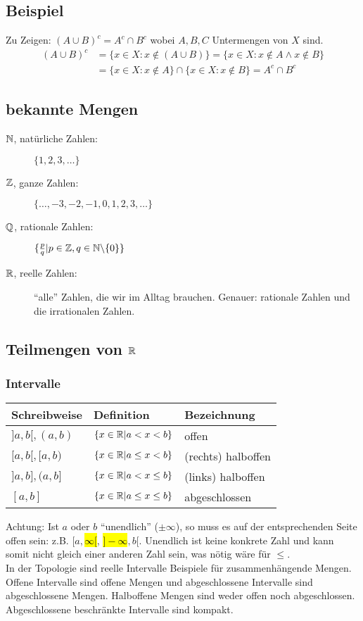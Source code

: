\subsection*{Beispiel}
Zu Zeigen: $(A \cup B)^c = A^c \cap B^c$ wobei $A, B, C$ Untermengen von $X$ sind.
\begin{align*}
(A \cup B)^c &= \{x \in X: x \not\in (A \cup B)\} = \{x \in X: x \not\in A \land x \not\in B\}\\
&= \{x \in X: x \not\in A\} \cap \{x \in X: x \not\in B\} = A^c \cap B^c
\end{align*}

\subsection{bekannte Mengen}
\begin{description}
	\item[$\mathbb{N}$, natürliche Zahlen:] $\{1, 2, 3, \ldots\}$
	\item[$\mathbb{Z}$, ganze Zahlen:] $\{\ldots, -3, -2, -1, 0, 1, 2, 3, \ldots\}$
	\item[$\mathbb{Q}$, rationale Zahlen:] $\{\frac{p}{q} | p \in \mathbb{Z}, q \in \mathbb{N} \backslash \{0\}\}$
	\item[$\mathbb{R}$, reelle Zahlen:] ``alle'' Zahlen, die wir im Alltag brauchen. Genauer: rationale Zahlen und die irrationalen Zahlen.
\end{description}

\subsection{Teilmengen von $\mathbb{R}$}
\subsubsection{Intervalle}
\begin{tabular}{|l|l|l|}\hline
Schreibweise & Definition & Bezeichnung\\\hline
$]a, b[, (a,b)$ & $\{x \in \mathbb{R} | a < x < b\}$ & offen\\\hline
$[a, b[, [a, b)$ & $\{x \in \mathbb{R} | a \leq x < b\}$ & (rechts) halboffen \\\hline
$]a,b], (a, b]$ & $\{x \in \mathbb{R} | a < x \leq b\}$ & (links) halboffen \\\hline
$[a,b]$ & $\{x \in \mathbb{R} | a \leq x \leq b\}$ & abgeschlossen \\\hline
\end{tabular}

Achtung: Ist $a$ oder $b$ ``unendlich'' ($\pm \infty$), so muss es auf der entsprechenden Seite offen sein: z.B. $[a, $\hl{$\infty[$}, \hl{$]-\infty$}$, b[$.
Unendlich ist keine konkrete Zahl und kann somit nicht gleich einer anderen Zahl sein, was nötig wäre für $\leq$. \\
In der Topologie sind reelle Intervalle Beispiele für zusammenhängende Mengen. Offene Intervalle sind offene Mengen und abgeschlossene Intervalle sind abgeschlossene Mengen. Halboffene Mengen sind weder offen noch abgeschlossen. Abgeschlossene beschränkte Intervalle sind kompakt.

